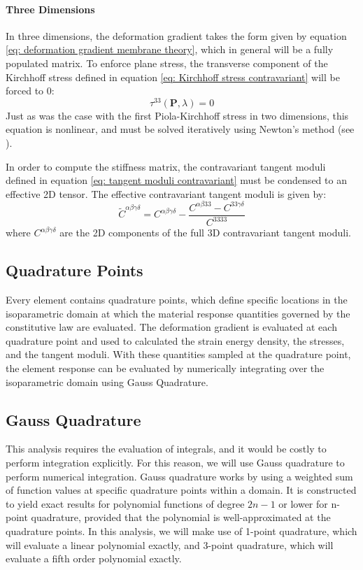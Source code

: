 \documentclass[]{spie}  %
\begin{document}
\paragraph{Three Dimensions}
In three dimensions, the deformation gradient takes the form given by equation \ref{eq: deformation gradient membrane theory}, which in general will be a fully populated matrix. To enforce plane stress, the transverse component of the Kirchhoff stress defined in equation \ref{eq: Kirchhoff stress contravariant} will be forced to 0:
\begin{equation}
\tau^{33}(\bm{P}, \lambda) = 0
\end{equation}
Just as was the case with the first Piola-Kirchhoff stress in two dimensions, this equation is nonlinear, and must be solved iteratively using Newton's method (see \textit{}).

In order to compute the stiffness matrix, the contravariant tangent moduli defined in equation \ref{eq: tangent moduli contravariant} must be condensed to an effective 2D tensor. The effective contravariant tangent moduli is given by:
\begin{equation}
\label{eq: tangent moduli 2d effective}
\tilde{C}^{\alpha\beta\gamma\delta} = C^{\alpha\beta\gamma\delta} - \frac{C^{\alpha\beta 3 3} - C^{3 3 \gamma\delta}}{C^{3333}}
\end{equation}
where $C^{\alpha\beta\gamma\delta}$ are the 2D components of the full 3D contravariant tangent moduli.


\subsection{Quadrature Points}
Every element contains quadrature points, which define specific locations in the isoparametric domain at which the material response quantities governed by the constitutive law are evaluated. The deformation gradient is evaluated at each quadrature point and used to calculated the strain energy density, the stresses, and the tangent moduli. With these quantities sampled at the quadrature point, the element response can be evaluated by numerically integrating over the isoparametric domain using Gauss Quadrature.

\subsection{Gauss Quadrature}
This analysis requires the evaluation of integrals, and it would be costly to perform integration explicitly. For this reason, we will use Gauss quadrature to perform numerical integration. Gauss quadrature works by using a weighted sum of function values at specific quadrature points within a domain. It is constructed to yield exact results for polynomial functions of degree $2n-1$ or lower for n-point quadrature, provided that the polynomial is well-approximated at the quadrature points. In this analysis, we will make use of 1-point quadrature, which will evaluate a linear polynomial exactly, and 3-point quadrature, which will evaluate a fifth order polynomial exactly. 
\end{document}
